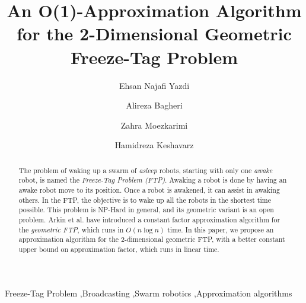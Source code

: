 \documentclass[review]{elsarticle}
\begin{document}
\begin{frontmatter}

\title{An O(1)-Approximation Algorithm for the 2-Dimensional Geometric Freeze-Tag Problem}

\author[aut]{Ehsan Najafi Yazdi}
\author[aut]{Alireza Bagheri}
\author[aut]{Zahra Moezkarimi}
\author[tmu]{Hamidreza Keshavarz}

\address[aut]{Computer Engineering and Information Technology Department, Amirkabir University of Technology, Tehran, Iran}
\address[tmu]{Faculty of Electrical and Computer Engineering, Tarbiat Modares University, Tehran, Iran}

\begin{abstract}
The problem of waking up a swarm of \textit{asleep} robots, starting with only one \textit{awake} robot, is named the \textit{Freeze-Tag Problem (FTP)}. Awaking a robot is done by having an awake robot move to its position. Once a robot is awakened, it can assist in awaking others. In the FTP, the objective is to wake up all the robots in the shortest time possible. This problem is NP-Hard in general, and its geometric variant is an open problem. Arkin et al. have introduced a constant factor approximation algorithm for the \textit{geometric FTP}, which runs in ${ O(n\log n) }$ time. In this paper, we propose an approximation algorithm for the 2-dimensional geometric FTP, with a better constant upper bound on approximation factor, which runs in linear time.
\end{abstract}

\begin{keyword}
Freeze-Tag Problem \sep Broadcasting \sep Swarm robotics \sep Approximation algorithms
\end{keyword}

\end{frontmatter}

\linenumbers
\end{document}
